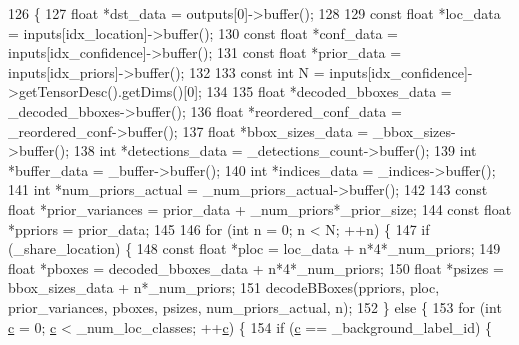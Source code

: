 \begin{DoxyCode}
126                                                              \{
127         \textcolor{keywordtype}{float} *dst\_data = outputs[0]->buffer();
128 
129         \textcolor{keyword}{const} \textcolor{keywordtype}{float} *loc\_data    = inputs[idx\_location]->buffer();
130         \textcolor{keyword}{const} \textcolor{keywordtype}{float} *conf\_data   = inputs[idx\_confidence]->buffer();
131         \textcolor{keyword}{const} \textcolor{keywordtype}{float} *prior\_data  = inputs[idx\_priors]->buffer();
132 
133         \textcolor{keyword}{const} \textcolor{keywordtype}{int} N = inputs[idx\_confidence]->getTensorDesc().getDims()[0];
134 
135         \textcolor{keywordtype}{float} *decoded\_bboxes\_data = \_decoded\_bboxes->buffer();
136         \textcolor{keywordtype}{float} *reordered\_conf\_data = \_reordered\_conf->buffer();
137         \textcolor{keywordtype}{float} *bbox\_sizes\_data     = \_bbox\_sizes->buffer();
138         \textcolor{keywordtype}{int} *detections\_data       = \_detections\_count->buffer();
139         \textcolor{keywordtype}{int} *buffer\_data           = \_buffer->buffer();
140         \textcolor{keywordtype}{int} *indices\_data          = \_indices->buffer();
141         \textcolor{keywordtype}{int} *num\_priors\_actual     = \_num\_priors\_actual->buffer();
142 
143         \textcolor{keyword}{const} \textcolor{keywordtype}{float} *prior\_variances = prior\_data + \_num\_priors*\_prior\_size;
144         \textcolor{keyword}{const} \textcolor{keywordtype}{float} *ppriors = prior\_data;
145 
146         \textcolor{keywordflow}{for} (\textcolor{keywordtype}{int} n = 0; n < N; ++n) \{
147             \textcolor{keywordflow}{if} (\_share\_location) \{
148                 \textcolor{keyword}{const} \textcolor{keywordtype}{float} *ploc = loc\_data + n*4*\_num\_priors;
149                 \textcolor{keywordtype}{float} *pboxes = decoded\_bboxes\_data + n*4*\_num\_priors;
150                 \textcolor{keywordtype}{float} *psizes = bbox\_sizes\_data + n*\_num\_priors;
151                 decodeBBoxes(ppriors, ploc, prior\_variances, pboxes, psizes, num\_priors\_actual, n);
152             \} \textcolor{keywordflow}{else} \{
153                 \textcolor{keywordflow}{for} (\textcolor{keywordtype}{int} \hyperlink{CMakeCache_8txt_aac1d6a1710812201527c735f7c6afbaa}{c} = 0; \hyperlink{CMakeCache_8txt_aac1d6a1710812201527c735f7c6afbaa}{c} < \_num\_loc\_classes; ++\hyperlink{CMakeCache_8txt_aac1d6a1710812201527c735f7c6afbaa}{c}) \{
154                     \textcolor{keywordflow}{if} (\hyperlink{CMakeCache_8txt_aac1d6a1710812201527c735f7c6afbaa}{c} == \_background\_label\_id) \{

\end{DoxyCode}

